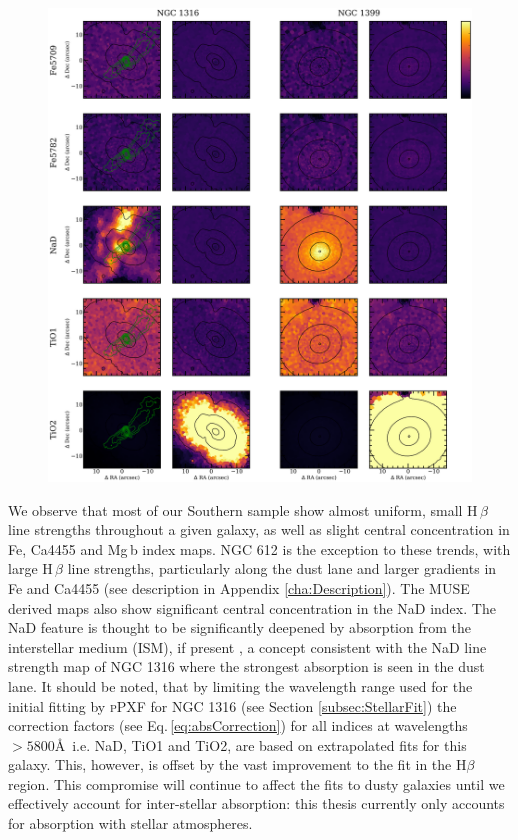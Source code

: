 		\begin{figure}
			\centering
			\includegraphics[height=0.67\textheight]{chapter4/muse/abs2b.png}
		\end{figure}

			We observe that most of our Southern sample show almost uniform, small H\,$\beta$ line strengths throughout a given galaxy, as well as slight central concentration in Fe, Ca4455 and Mg\,b index maps. NGC 612 is the exception to these trends, with large H\,$\beta$ line strengths, particularly along the dust lane and larger gradients in Fe and Ca4455 (see description in Appendix \ref{cha:Description}). The MUSE derived maps also show significant central concentration in the NaD index. The NaD feature is thought to be significantly deepened by absorption from the interstellar medium (ISM), if present \citep[e.g.][]{Phillips1993, Bergmann2009}, a concept consistent with the NaD line strength map of NGC 1316 where the strongest absorption is seen in the dust lane. %
			It should be noted, that by limiting the wavelength range used for the initial fitting by \textsc{pPXF} for NGC 1316 (see Section \ref{subsec:StellarFit}) the correction factors (see Eq.\,\ref{eq:absCorrection}) for all indices at wavelengths $> 5800$\AA\ i.e. NaD, TiO1 and TiO2, are based on extrapolated fits for this galaxy. This, however, is offset by the vast improvement to the fit in the H$\beta$ region. This compromise will continue to affect the fits to dusty galaxies until we effectively account for inter-stellar absorption: this thesis currently only accounts for absorption with stellar atmospheres. 




